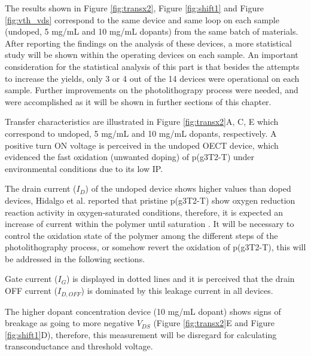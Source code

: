 The results shown in Figure \ref{fig:transx2}, Figure \ref{fig:shift1} and Figure \ref{fig:vth_vds} correspond to the same device and same loop on each sample (undoped, 5 mg/mL and 10 mg/mL dopants) from the same batch of materials. After reporting the findings on the analysis of these devices, a more statistical study will be shown within the operating devices on each sample. An important consideration for the statistical analysis of this part is that besides the attempts to increase the yields, only 3 or 4 out of the 14 devices were operational on each sample. Further improvements on the photolithograpy process were needed, and were accomplished as it will be shown in further sections of this chapter. 

Transfer characteristics are illustrated in Figure \ref{fig:transx2}A, C, E which correspond to undoped, 5 mg/mL and 10 mg/mL dopants, respectively. A positive turn ON voltage is perceived in the undoped OECT device, which evidenced the fast oxidation (unwanted doping) of p(g3T2-T) under environmental conditions due to its low IP. 

The drain current ($I_{D}$) of the undoped device shows higher values than doped devices, Hidalgo et al. reported that pristine p(g3T2-T) show oxygen reduction reaction activity in oxygen-saturated conditions, therefore, it is expected an increase of current within the polymer until saturation \cite{hidalgocastilloSimultaneousPerformanceStability2022a}. It will be necessary to control the oxidation state of the polymer among the different steps of the photolithography process, or somehow revert the oxidation of p(g3T2-T), this will be addressed in the following sections.

Gate current ($I_{G}$) is displayed in dotted lines and it is perceived that the drain OFF current ($I_{D,OFF}$) is dominated by this leakage current in all devices. %

The higher dopant concentration device (10 mg/mL dopant) shows signs of breakage as going to more negative $V_{DS}$ (Figure \ref{fig:transx2}E and Figure \ref{fig:shift1}D), therefore, this measurement will be disregard for calculating transconductance and threshold voltage.

